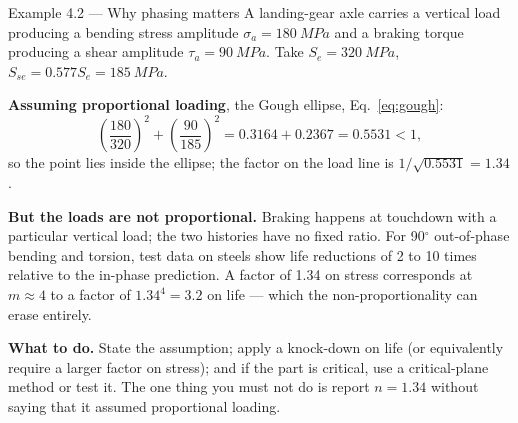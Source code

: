\documentclass[11pt,a4paper]{article}
\begin{document}
\begin{examplebox}{Example 4.2 --- Why phasing matters}
A landing-gear axle carries a vertical load producing a bending stress amplitude $\sigma_a=\SI{180}{MPa}$ and a braking torque producing a shear amplitude $\tau_a=\SI{90}{MPa}$. Take $S_e=\SI{320}{MPa}$, $S_{se}=0.577S_e=\SI{185}{MPa}$.

\textbf{Assuming proportional loading}, the Gough ellipse, Eq.~\eqref{eq:gough}:
\[
\left(\frac{180}{320}\right)^{2}+\left(\frac{90}{185}\right)^{2}=0.3164+0.2367=0.5531<1,
\]
so the point lies inside the ellipse; the factor on the load line is $1/\sqrt{0.5531}=\mathbf{1.34}$.

\medskip
\textbf{But the loads are not proportional.} Braking happens at touchdown with a particular vertical load; the two histories have no fixed ratio. For 90$^\circ$ out-of-phase bending and torsion, test data on steels show life reductions of 2 to 10 times relative to the in-phase prediction. A factor of 1.34 on stress corresponds at $m\approx4$ to a factor of $1.34^{4}=3.2$ on life --- which the non-proportionality can erase entirely.

\medskip
\textbf{What to do.} State the assumption; apply a knock-down on life (or equivalently require a larger factor on stress); and if the part is critical, use a critical-plane method or test it. The one thing you must not do is report $n=1.34$ without saying that it assumed proportional loading.
\end{examplebox}
\end{document}
